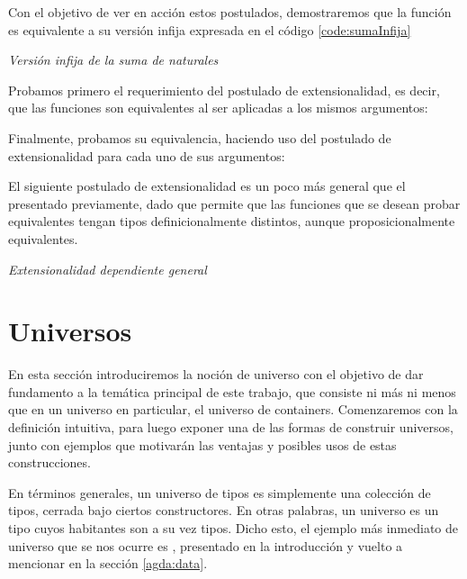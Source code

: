 Con el objetivo de ver en acción estos postulados, demostraremos que la función  es equivalente a su versión infija expresada en el código \ref{code:sumaInfija}
\begin{agdacode}\label{code:sumaInfija}{\it Versión infija de la suma de naturales}

\end{agdacode}

Probamos primero el requerimiento del postulado de extensionalidad, es decir, que las funciones son equivalentes al ser aplicadas a los mismos argumentos:


Finalmente, probamos su equivalencia, haciendo uso del postulado de extensionalidad para cada uno de sus argumentos:


El siguiente postulado de extensionalidad es un poco más general que el presentado previamente, dado que permite que las funciones que se desean probar equivalentes tengan tipos definicionalmente distintos, aunque proposicionalmente equivalentes.

\begin{agdacode}\label{code:dext}{\it Extensionalidad dependiente general }

\end{agdacode}




\section{Universos} \label{universos}


En esta sección introduciremos la noción de universo con el objetivo de dar fundamento a la temática principal de este trabajo, que consiste ni más ni menos que en un universo en particular, el universo de containers. Comenzaremos con la definición intuitiva, para luego exponer una de las formas de construir universos, junto con ejemplos que motivarán las ventajas y posibles usos de estas construcciones.

En términos generales, un universo de tipos es simplemente una colección de tipos, cerrada bajo ciertos constructores. En otras palabras, un universo es un tipo cuyos habitantes son a su vez tipos. Dicho esto, el ejemplo más inmediato de universo que se nos ocurre es , 
presentado en la introducción y vuelto a mencionar en la sección \ref{agda:data}.

